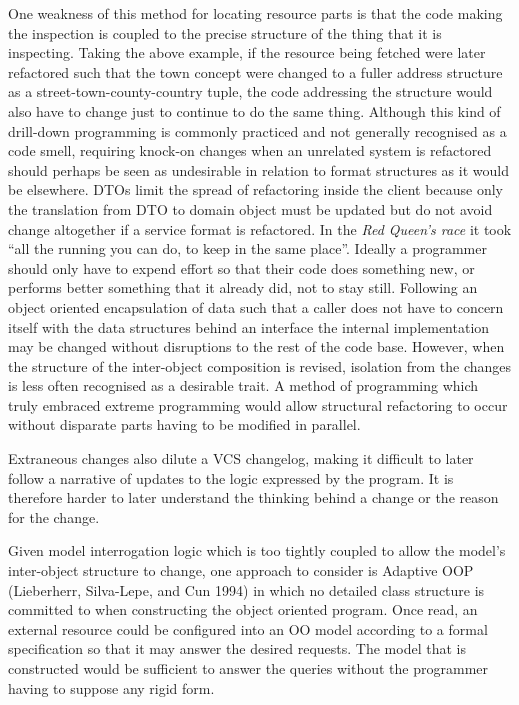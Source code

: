 \documentclass[12pt, ]{article}
\begin{document}
One weakness of this method for locating resource parts is that the code
making the inspection is coupled to the precise structure of the thing
that it is inspecting. Taking the above example, if the resource being
fetched were later refactored such that the town concept were changed to
a fuller address structure as a street-town-county-country tuple, the
code addressing the structure would also have to change just to continue
to do the same thing. Although this kind of drill-down programming is
commonly practiced and not generally recognised as a code smell,
requiring knock-on changes when an unrelated system is refactored should
perhaps be seen as undesirable in relation to format structures as it
would be elsewhere. DTOs limit the spread of refactoring inside the
client because only the translation from DTO to domain object must be
updated but do not avoid change altogether if a service format is
refactored. In the \emph{Red Queen's race} it took ``all the running you
can do, to keep in the same place''. Ideally a programmer should only
have to expend effort so that their code does something new, or performs
better something that it already did, not to stay still. Following an
object oriented encapsulation of data such that a caller does not have
to concern itself with the data structures behind an interface the
internal implementation may be changed without disruptions to the rest
of the code base. However, when the structure of the inter-object
composition is revised, isolation from the changes is less often
recognised as a desirable trait. A method of programming which truly
embraced extreme programming would allow structural refactoring to occur
without disparate parts having to be modified in parallel.

Extraneous changes also dilute a VCS changelog, making it difficult to
later follow a narrative of updates to the logic expressed by the
program. It is therefore harder to later understand the thinking behind
a change or the reason for the change.

Given model interrogation logic which is too tightly coupled to allow
the model's inter-object structure to change, one approach to consider
is Adaptive OOP (Lieberherr, Silva-Lepe, and Cun 1994) in which no
detailed class structure is committed to when constructing the object
oriented program. Once read, an external resource could be configured
into an OO model according to a formal specification so that it may
answer the desired requests. The model that is constructed would be
sufficient to answer the queries without the programmer having to
suppose any rigid form.
\end{document}
